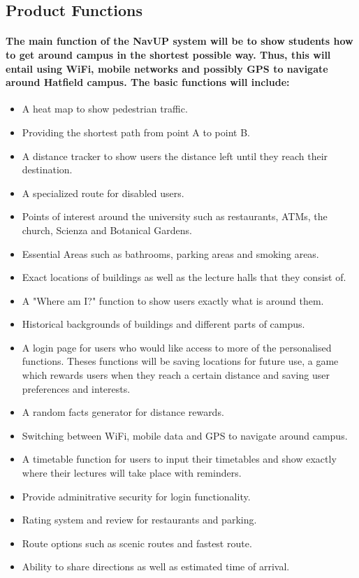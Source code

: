 \documentclass{article}
\begin{document}
		\subsection{Product Functions} \paragraph{The main function of the NavUP system will be to show students how to get around campus in the shortest possible way. Thus, this will entail using WiFi, mobile networks and possibly GPS to navigate around Hatfield campus. The basic functions will include:  }
	\begin{itemize}
  		\item A heat map to show pedestrian traffic.
		\item Providing the shortest path from point A to point B.
 		 \item A distance tracker to show users the distance left until they reach their destination.
		\item A specialized route for disabled users.
		\item Points of interest around the university such as restaurants, ATMs, the church, Scienza and Botanical Gardens.
 		 \item Essential Areas such as bathrooms, parking areas and smoking areas.
		\item Exact locations of buildings as well as the lecture halls that they consist of.
		\item A "Where am I?" function to show users exactly what is around them.
 		 \item Historical backgrounds of buildings and different parts of campus.
		\item A login page for users who would like access to more of the personalised functions. Theses functions will be saving locations for future use, a game which rewards users when they reach a certain distance and saving user preferences and interests.
		\item A random facts generator for distance rewards.
		\item Switching between WiFi, mobile data and GPS to navigate around campus.
		\item A timetable function for users to input their timetables and show exactly where their lectures will take place with reminders.
		\item Provide adminitrative security for login functionality.
		\item Rating system and review for restaurants and parking.
		\item Route options such as scenic routes and fastest route.
		\item Ability to share directions as well as estimated time of arrival.
	\end{itemize}
\end{document}
